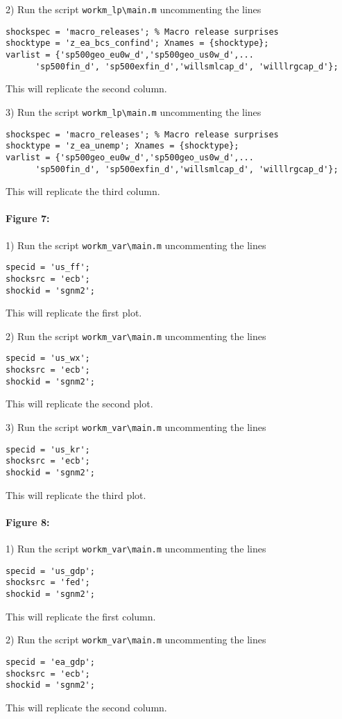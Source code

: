 \documentclass[12pt]{article}
\begin{document}
2) Run the script
\verb|workm_lp\main.m| uncommenting the lines
\begin{verbatim}
shockspec = 'macro_releases'; % Macro release surprises
shocktype = 'z_ea_bcs_confind'; Xnames = {shocktype};
varlist = {'sp500geo_eu0w_d','sp500geo_us0w_d',...
      'sp500fin_d', 'sp500exfin_d','willsmlcap_d', 'willlrgcap_d'};
\end{verbatim}
This will replicate the second column.

3) Run the script
\verb|workm_lp\main.m| uncommenting the lines
\begin{verbatim}
shockspec = 'macro_releases'; % Macro release surprises
shocktype = 'z_ea_unemp'; Xnames = {shocktype};
varlist = {'sp500geo_eu0w_d','sp500geo_us0w_d',...
      'sp500fin_d', 'sp500exfin_d','willsmlcap_d', 'willlrgcap_d'};
\end{verbatim}
This will replicate the third column.

\paragraph{Figure 7:}
1) Run the script
\verb|workm_var\main.m| uncommenting the lines
\begin{verbatim}
specid = 'us_ff';
shocksrc = 'ecb';
shockid = 'sgnm2';
\end{verbatim}
This will replicate the first plot.

2) Run the script
\verb|workm_var\main.m| uncommenting the lines
\begin{verbatim}
specid = 'us_wx';
shocksrc = 'ecb';
shockid = 'sgnm2';
\end{verbatim}
This will replicate the second plot.

3) Run the script
\verb|workm_var\main.m| uncommenting the lines
\begin{verbatim}
specid = 'us_kr';
shocksrc = 'ecb';
shockid = 'sgnm2';
\end{verbatim}
This will replicate the third plot.

\paragraph{Figure 8:}
1) Run the script
\verb|workm_var\main.m| uncommenting the lines
\begin{verbatim}
specid = 'us_gdp';
shocksrc = 'fed';
shockid = 'sgnm2';
\end{verbatim}
This will replicate the first column.

2) Run the script
\verb|workm_var\main.m| uncommenting the lines
\begin{verbatim}
specid = 'ea_gdp';
shocksrc = 'ecb';
shockid = 'sgnm2';
\end{verbatim}
This will replicate the second column.
\end{document}
